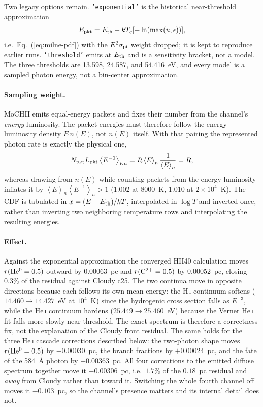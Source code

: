 \documentclass[english,a4paper]{my_memo}
\newcommand{\code}[1]{\texttt{#1}}
\begin{document}
Two legacy options remain.  \code{'exponential'} is the historical
near-threshold approximation
\begin{equation}
 E_{\rm pkt}=E_{\rm th}+kT_e[-\ln(\max(u,\epsilon))],
 \label{eq:diffuse-energy}
\end{equation}
i.e.\ Eq.~(\ref{eq:milne-pdf}) with the $E^2\sigma_{\rm pi}$ weight dropped;
it is kept to reproduce earlier runs.  \code{'threshold'} emits at
$E_{\rm th}$ and is a sensitivity bracket, not a model.  The three
thresholds are 13.598, 24.587, and 54.416~eV, and every model is a sampled
photon energy, not a bin-center approximation.

\paragraph{Sampling weight.}  MoCHII emits equal-energy packets and fixes
their number from the channel's \emph{energy} luminosity.  The packet
energies must therefore follow the energy-luminosity density $E\,n(E)$,
not $n(E)$ itself.  With that pairing the represented photon rate is exactly
the physical one,
\begin{equation}
 N_{\rm pkt}L_{\rm pkt}\left<E^{-1}\right>_{En}
   = R\left<E\right>_n\frac{1}{\left<E\right>_n}=R ,
\end{equation}
whereas drawing from $n(E)$ while counting packets from the energy
luminosity inflates it by $\left<E\right>_n\left<E^{-1}\right>_n>1$
(1.002 at $8000$~K, 1.010 at $2\times10^4$~K).  The CDF is tabulated in
$x=(E-E_{\rm th})/kT$, interpolated in $\log T$ and inverted once, rather
than inverting two neighboring temperature rows and interpolating the
resulting energies.

\paragraph{Effect.}  Against the exponential approximation the converged
HII40 calculation moves $r({\rm He^0}=0.5)$ outward by $0.00063$~pc and
$r({\rm C^{2+}}=0.5)$ by $0.00052$~pc, closing $0.3\%$ of the residual
against Cloudy c25.  The two continua move in opposite directions because
each follows its own mean energy: the H\,\textsc{i} continuum softens
($14.460\rightarrow14.427$~eV at $10^4$~K) since the hydrogenic cross
section falls as $E^{-3}$, while the He\,\textsc{i} continuum hardens
($25.449\rightarrow25.460$~eV) because the Verner He\,\textsc{i} fit falls
more slowly near threshold.  The exact spectrum is therefore a correctness
fix, not the explanation of the Cloudy front residual.  The same holds for
the three He\,\textsc{i} cascade corrections described below: the two-photon
shape moves $r({\rm He^0}=0.5)$ by $-0.00030$~pc, the branch fractions by
$+0.00024$~pc, and the fate of the 584~\AA{} photon by $-0.00363$~pc.  All
four corrections to the emitted diffuse spectrum together move it
$-0.00306$~pc, i.e.\ $1.7\%$ of the $0.18$~pc residual and \emph{away} from
Cloudy rather than toward it.  Switching the whole fourth channel off moves
it $-0.103$~pc, so the channel's presence matters and its internal detail
does not.
\end{document}
